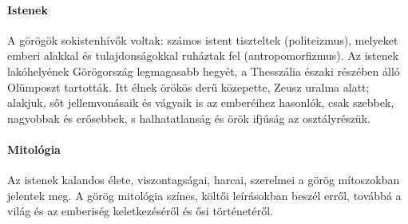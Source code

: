 \paragraph{Istenek}
A görögök sokistenhívők voltak: számos istent tiszteltek (politeizmus), melyeket emberi alakkal és tulajdonságokkal ruháztak fel (antropomorfizmus). Az istenek lakóhelyének Görögország legmagasabb hegyét, a Thesszália északi részében álló Olümposzt tartották. Itt élnek örökös derű közepette, Zeusz uralma alatt; alakjuk, sőt jellemvonásaik és vágyaik is az emberéihez hasonlók, csak szebbek, nagyobbak és erősebbek, s halhatatlanság és örök ifjúság az osztályrészük.

\paragraph{Mitológia}
Az istenek kalandos élete, viszontagságai, harcai, szerelmei a görög mítoszokban jelentek meg. A görög mitológia színes, költői leírásokban beszél erről, továbbá a világ és az emberiség keletkezéséről és ősi történetéről.

